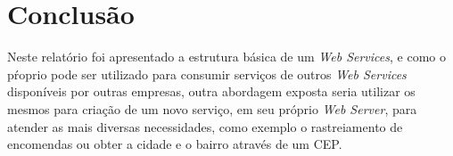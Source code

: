 \documentclass[12pt]{article}
\begin{document}
\section{Conclusão}
Neste relatório foi apresentado a estrutura básica de um \textit{Web Services}, e como o pŕoprio pode ser utilizado para consumir serviços de outros \textit{Web Services} disponíveis por outras empresas, outra abordagem exposta seria utilizar os mesmos para criação de um novo serviço, em seu próprio \textit{Web Server}, para atender as mais diversas necessidades, como exemplo o rastreiamento de encomendas ou obter a cidade e o bairro através de um CEP.	  	

	  
\end{document}

